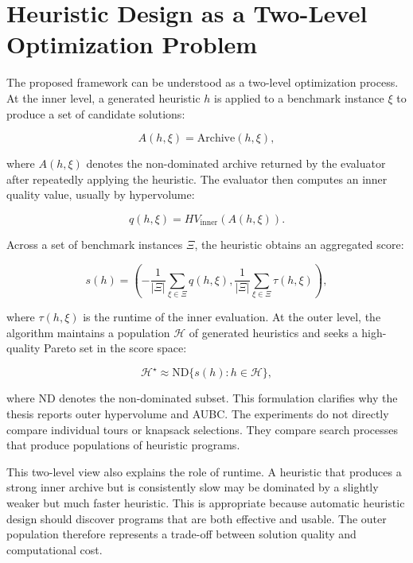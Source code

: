 \section{Heuristic Design as a Two-Level Optimization Problem}

The proposed framework can be understood as a two-level optimization process. At the inner level, a generated heuristic $h$ is applied to a benchmark instance $\xi$ to produce a set of candidate solutions:

\begin{equation}
  A(h,\xi) = \mathrm{Archive}\left(h, \xi\right),
\end{equation}

where $A(h,\xi)$ denotes the non-dominated archive returned by the evaluator after repeatedly applying the heuristic. The evaluator then computes an inner quality value, usually by hypervolume:

\begin{equation}
  q(h,\xi) = HV_{\mathrm{inner}}\left(A(h,\xi)\right).
\end{equation}

Across a set of benchmark instances $\Xi$, the heuristic obtains an aggregated score:

\begin{equation}
  s(h)
  =
  \left(
    -\frac{1}{|\Xi|}\sum_{\xi \in \Xi} q(h,\xi),
    \frac{1}{|\Xi|}\sum_{\xi \in \Xi} \tau(h,\xi)
  \right),
\end{equation}

where $\tau(h,\xi)$ is the runtime of the inner evaluation. At the outer level, the algorithm maintains a population $\mathcal{H}$ of generated heuristics and seeks a high-quality Pareto set in the score space:

\begin{equation}
  \mathcal{H}^{\star}
  \approx
  \mathrm{ND}\{s(h): h \in \mathcal{H}\},
\end{equation}

where $\mathrm{ND}$ denotes the non-dominated subset. This formulation clarifies why the thesis reports outer hypervolume and AUBC. The experiments do not directly compare individual tours or knapsack selections. They compare search processes that produce populations of heuristic programs.

This two-level view also explains the role of runtime. A heuristic that produces a strong inner archive but is consistently slow may be dominated by a slightly weaker but much faster heuristic. This is appropriate because automatic heuristic design should discover programs that are both effective and usable. The outer population therefore represents a trade-off between solution quality and computational cost.

